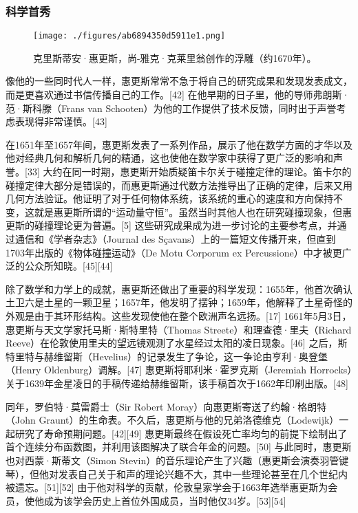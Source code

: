 \subsubsection{科学首秀}
\begin{figure}[ht]
\centering
\texttt{[image: ./figures/ab6894350d5911e1.png]}
\caption{克里斯蒂安·惠更斯，尚-雅克·克莱里翁创作的浮雕（约1670年）。} \label{fig_HGS_4}
\end{figure}
像他的一些同时代人一样，惠更斯常常不急于将自己的研究成果和发现发表成文，而是更喜欢通过书信传播自己的工作。[42] 在他早期的日子里，他的导师弗朗斯·范·斯科滕（Frans van Schooten）为他的工作提供了技术反馈，同时出于声誉考虑表现得非常谨慎。[43]

在1651年至1657年间，惠更斯发表了一系列作品，展示了他在数学方面的才华以及他对经典几何和解析几何的精通，这也使他在数学家中获得了更广泛的影响和声誉。[33] 大约在同一时期，惠更斯开始质疑笛卡尔关于碰撞定律的理论。笛卡尔的碰撞定律大部分是错误的，而惠更斯通过代数方法推导出了正确的定律，后来又用几何方法验证。他证明了对于任何物体系统，该系统的重心的速度和方向保持不变，这就是惠更斯所谓的“运动量守恒”。虽然当时其他人也在研究碰撞现象，但惠更斯的碰撞理论更为普遍。[5] 这些研究成果成为进一步讨论的主要参考点，并通过通信和《学者杂志》（Journal des Sçavans）上的一篇短文传播开来，但直到1703年出版的《物体碰撞运动》（De Motu Corporum ex Percussione）中才被更广泛的公众所知晓。[45][44]

除了数学和力学上的成就，惠更斯还做出了重要的科学发现：1655年，他首次确认土卫六是土星的一颗卫星；1657年，他发明了摆钟；1659年，他解释了土星奇怪的外观是由于其环形结构。这些发现使他在整个欧洲声名远扬。[17] 1661年5月3日，惠更斯与天文学家托马斯·斯特里特（Thomas Streete）和理查德·里夫（Richard Reeve）在伦敦使用里夫的望远镜观测了水星经过太阳的凌日现象。[46] 之后，斯特里特与赫维留斯（Hevelius）的记录发生了争论，这一争论由亨利·奥登堡（Henry Oldenburg）调解。[47] 惠更斯将耶利米·霍罗克斯（Jeremiah Horrocks）关于1639年金星凌日的手稿传递给赫维留斯，该手稿首次于1662年印刷出版。[48]

同年，罗伯特·莫雷爵士（Sir Robert Moray）向惠更斯寄送了约翰·格朗特（John Graunt）的生命表。不久后，惠更斯与他的兄弟洛德维克（Lodewijk）一起研究了寿命预期问题。[42][49] 惠更斯最终在假设死亡率均匀的前提下绘制出了首个连续分布函数图，并利用该图解决了联合年金的问题。[50] 与此同时，惠更斯也对西蒙·斯蒂文（Simon Stevin）的音乐理论产生了兴趣（惠更斯会演奏羽管键琴），但他对发表自己关于和声的理论兴趣不大，其中一些理论甚至在几个世纪内被遗忘。[51][52] 由于他对科学的贡献，伦敦皇家学会于1663年选举惠更斯为会员，使他成为该学会历史上首位外国成员，当时他仅34岁。[53][54]
